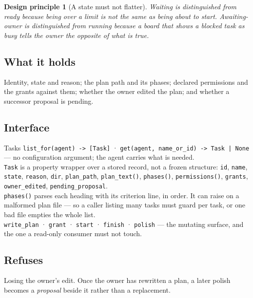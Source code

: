 \documentclass[11pt]{article}
\newtheorem{principle}{Design principle}
\newcommand{\code}[1]{\texttt{\small #1}}
\begin{document}
\begin{principle}[A state must not flatter]
\label{prin:states}
\emph{Waiting} is distinguished from \emph{ready} because being over a limit is not the same as being about to start. \emph{Awaiting-owner} is distinguished from \emph{running} because a board that shows a blocked task as busy tells the owner the opposite of what is true.
\end{principle}

\subsection{What it holds}

Identity, state and reason; the plan path and its phases; declared permissions and the grants against them; whether the owner edited the plan; and whether a successor proposal is pending.

\subsection{Interface}

\begin{specbox}{Tasks}
\code{list\_for(agent) -> [Task]} · \code{get(agent, name\_or\_id) -> Task | None} --- no configuration argument; the agent carries what is needed.\\[3pt]
\code{Task} is a property wrapper over a stored record, not a frozen structure: \code{id}, \code{name}, \code{state}, \code{reason}, \code{dir}, \code{plan\_path}, \code{plan\_text()}, \code{phases()}, \code{permissions()}, \code{grants}, \code{owner\_edited}, \code{pending\_proposal}.\\[3pt]
\code{phases()} parses each heading with its criterion line, in order. It can raise on a malformed plan file --- so a caller listing many tasks must guard per task, or one bad file empties the whole list.\\[3pt]
\code{write\_plan} · \code{grant} · \code{start} · \code{finish} · \code{polish} --- the mutating surface, and the one a read-only consumer must not touch.
\end{specbox}

\subsection{Refuses}

Losing the owner's edit. Once the owner has rewritten a plan, a later polish becomes a \emph{proposal} beside it rather than a replacement.
\end{document}
